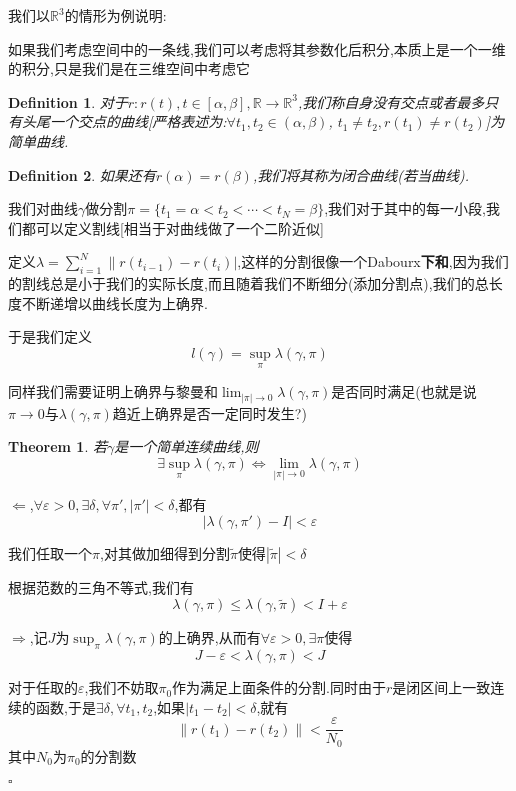 \documentclass[11pt,hyperref,a4paper,UTF8]{ctexart}
\newtheorem{theorem}{Theorem}[subsection]
\newtheorem{definition}{Definition}[subsection]
\newenvironment{cproof}{%
\heiti{证明}\kaishu
}{%
  \hfill $\square$
  \par\bigskip
}
\newcommand{\RR}{\mathbb{R}}
\begin{document}
\begin{CJK}{UTF8}{gkai}
我们以$\RR^3$的情形为例说明:

如果我们考虑空间中的一条线,我们可以考虑将其参数化后积分,本质上是一个一维的积分,只是我们是在三维空间中考虑它

\begin{definition}
对于$r: r(t), t\in [\alpha,\beta], \RR \to \RR^3$,我们称自身没有交点或者最多只有头尾一个交点的曲线[严格表述为:$\forall t_1,t_2 \in (\alpha,\beta)$, $t_1 \neq t_2, r(t_1) \neq r(t_2)$]为简单曲线.
\end{definition}

\begin{definition}
  如果还有$r(\alpha) = r(\beta)$,我们将其称为闭合曲线(若当曲线).\\
\end{definition}

我们对曲线$\gamma$做分割$\pi = \{t_1 = \alpha < t_2 < \cdots < t_N = \beta\}$,我们对于其中的每一小段,我们都可以定义割线[相当于对曲线做了一个二阶近似]

定义$\lambda = \sum_{i = 1}^{N} \|r(t_{i - 1})  - r(t_i)|$,这样的分割很像一个Dabourx\textbf{下和},因为我们的割线总是小于我们的实际长度,而且随着我们不断细分(添加分割点),我们的总长度不断递增以曲线长度为上确界.

于是我们定义
\[l(\gamma) = \sup_{\pi} \lambda(\gamma,\pi)\]

同样我们需要证明上确界与黎曼和$\lim_{|\pi|\to 0} \lambda(\gamma,\pi)$是否同时满足(也就是说$\pi \to 0$与$\lambda(\gamma,\pi)$趋近上确界是否一定同时发生?)

\begin{theorem}
  若$\gamma$是一个简单连续曲线,则
  \[\exists \sup_\pi \lambda(\gamma,\pi) \Leftrightarrow \lim_{|\pi| \to 0} \lambda(\gamma,\pi)\]
\end{theorem}

\begin{cproof}
  $\Leftarrow$,$\forall \varepsilon > 0, \exists \delta, \forall \pi', |\pi' | < \delta$,都有
  \[|\lambda(\gamma,\pi') - I| < \varepsilon\]

  我们任取一个$\pi$,对其做加细得到分割$\tilde{\pi}$使得$|\tilde{\pi}| < \delta$

  根据范数的三角不等式,我们有
  \[\lambda(\gamma,\pi) \leq \lambda(\gamma,\tilde{\pi}) < I + \varepsilon\]

  $\Rightarrow$,记$J$为$\sup_\pi \lambda(\gamma,\pi)$的上确界,从而有$\forall \varepsilon > 0 ,\exists \pi$使得
  \[J - \varepsilon < \lambda(\gamma,\pi) < J\]

  对于任取的$\varepsilon$,我们不妨取$\pi_0$作为满足上面条件的分割.同时由于$r$是闭区间上一致连续的函数,于是$\exists \delta,\forall t_1,t_2$,如果$|t_1  - t_2| < \delta$,就有
  \[\|r(t_1) - r(t_2)\| < \frac{\varepsilon}{N_0}\]
  其中$N_0$为$\pi_0$的分割数


\end{cproof}
\end{CJK}
\end{document}
